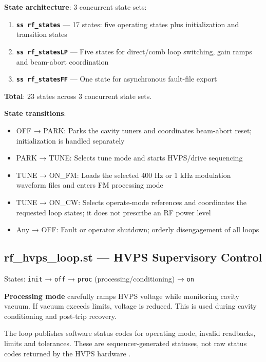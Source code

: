 \textbf{State architecture}: 3 concurrent state sets:

\begin{enumerate}
\def\labelenumi{\arabic{enumi}.}
\tightlist
\item
  \textbf{\texttt{ss\ rf\_states}} --- 17 states: five operating states plus initialization and transition states
\item
  \textbf{\texttt{ss\ rf\_statesLP}} --- Five states for direct/comb loop switching, gain ramps and beam-abort coordination
\item
  \textbf{\texttt{ss\ rf\_statesFF}} --- One state for asynchronous fault-file export
\end{enumerate}

\textbf{Total}: 23 states across 3 concurrent state sets.

\textbf{State transitions}:

\begin{itemize}
\tightlist
\item
  OFF → PARK: Parks the cavity tuners and coordinates beam-abort reset; initialization is handled separately
\item
  PARK → TUNE: Selects tune mode and starts HVPS/drive sequencing
\item
  TUNE → ON\_FM: Loads the selected 400 Hz or 1 kHz modulation waveform files and enters FM processing mode
\item
  TUNE → ON\_CW: Selects operate-mode references and coordinates the requested loop states; it does not prescribe an RF power level
\item
  Any → OFF: Fault or operator shutdown; orderly disengagement of all loops
\end{itemize}

\subsection{rf\_hvps\_loop.st --- HVPS Supervisory Control}

States: \texttt{init} → \texttt{off} → \texttt{proc} (processing/conditioning) → \texttt{on}

\textbf{Processing mode} carefully ramps HVPS voltage while monitoring cavity vacuum. If vacuum exceeds limits, voltage is reduced. This is used during cavity conditioning and post-trip recovery.

The loop publishes software status codes for operating mode, invalid readbacks, limits and tolerances. These are sequencer-generated statuses, not raw status codes returned by the HVPS hardware .


